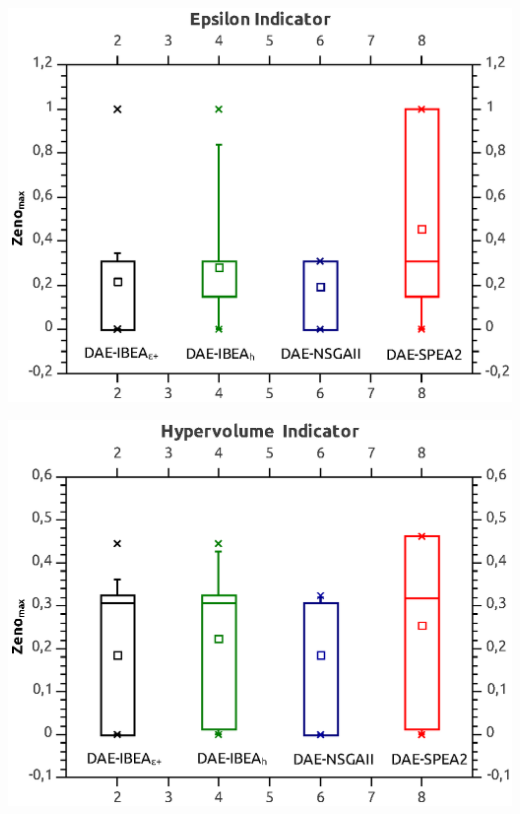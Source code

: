 \documentclass[a4paper,10pt]{report} %
\begin{document}
\begin{center}
 \includegraphics{./bp_zeno_max_eps.eps}
\end{center}
\begin{center}
 \includegraphics[bb=0 0 370 300]{./bp_zeno_max_hyper.eps}
\end{center}
\end{document}
